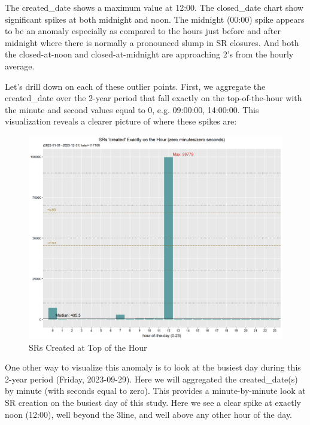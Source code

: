 \documentclass[12pt, titlepage]{article}
\begin{document}
	The created\_date shows a maximum value at 12:00. The closed\_date chart show significant spikes at both midnight
	and noon. The midnight (00:00) spike appears to be an anomaly especially as compared to the hours just 
	before and after midnight where there is normally a pronounced slump in SR closures. 
	And both the closed-at-noon and closed-at-midnight are approaching 2\textsigma's from the hourly average. 

	Let's drill down on each of these outlier points. First, we aggregate the created\_date over the 2-year period that fall exactly
	on the top-of-the-hour with the minute and second values equal to 0, e.g. 09:00:00, 14:00:00. This visualization
	reveals a clearer picture of where these spikes are:
	
	\begin{figure}[H]
		 \centering
		 \includegraphics[scale = 0.65]{SR_created_by_top_of_hour.png}
		 \caption{SRs Created at Top of the Hour}
		 \label{fig:tophourcreated}
	\end{figure}	

	One other way to visualize this anomaly is to look at the busiest day during this 2-year period (Friday, 2023-09-29).
	Here we will aggregated the created\_date(s) by minute (with seconds equal to zero). This provides a 
	minute-by-minute look at SR creation on the busiest day of this study. Here we see a clear spike at 
	exactly noon (12:00), well beyond the 3\textsigma line, and well above any other hour of the day.
	
\end{document}

